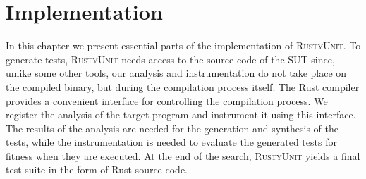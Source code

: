 \documentclass[paper=a4,%
  twoside,%
  BCOR4mm,%
  abstract=true,%
  toc=bibliography,%
  chapterprefix=true,%
  toc=bibliographynumbered,%
  open=right,%
  english,%
  pagesize=pdftex]{scrreprt}
\newcommand{\tech}{\textsc{RustyUnit}\xspace}
\begin{document}


\clearpage
\chapter{Implementation}
\label{chap:implementation}
In this chapter we present essential parts of the implementation of \tech. To generate tests, \tech needs access to the source code of the \ac{SUT} since, unlike some other tools, our analysis and instrumentation do not take place on the compiled binary, but during the compilation process itself. The Rust compiler provides a convenient interface for controlling the compilation process. We register the analysis of the target program and instrument it using this interface. The results of the analysis are needed for the generation and synthesis of the tests, while the instrumentation is needed to evaluate the generated tests for fitness when they are executed. At the end of the search, \tech yields a final test suite in the form of Rust source code.
\end{document}

